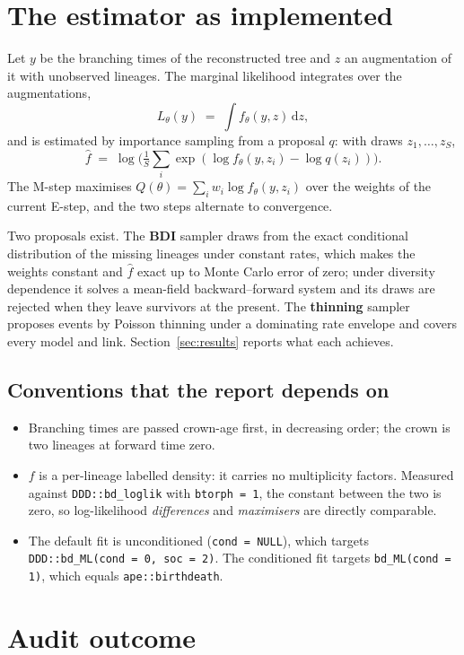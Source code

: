 \documentclass[11pt,a4paper]{article}
\newcommand{\code}[1]{\texttt{\small #1}}
\begin{document}
\section{The estimator as implemented}

Let $y$ be the branching times of the reconstructed tree and $z$ an augmentation of it with
unobserved lineages. The marginal likelihood integrates over the augmentations,
\[
  L_\theta(y) \;=\; \int f_\theta(y, z)\,\mathrm{d}z ,
\]
and is estimated by importance sampling from a proposal $q$: with draws $z_1,\dots,z_S$,
\[
  \widehat{f} \;=\; \log\Big( \tfrac{1}{S}\textstyle\sum_i \exp(\log f_\theta(y,z_i) - \log q(z_i)) \Big).
\]
The M-step maximises $Q(\theta) = \sum_i w_i \log f_\theta(y, z_i)$ over the weights of the current
E-step, and the two steps alternate to convergence.

Two proposals exist. The \textbf{BDI} sampler draws from the exact conditional distribution of the
missing lineages under constant rates, which makes the weights constant and $\widehat{f}$ exact up
to Monte Carlo error of zero; under diversity dependence it solves a mean-field backward--forward
system and its draws are rejected when they leave survivors at the present. The \textbf{thinning}
sampler proposes events by Poisson thinning under a dominating rate envelope and covers every
model and link. Section~\ref{sec:results} reports what each achieves.

\subsection{Conventions that the report depends on}
\begin{itemize}
\item Branching times are passed crown-age first, in decreasing order; the crown is two lineages
  at forward time zero.
\item $f$ is a per-lineage labelled density: it carries no multiplicity factors. Measured against
  \code{DDD::bd\_loglik} with \code{btorph = 1}, the constant between the two is zero, so
  log-likelihood \emph{differences} and \emph{maximisers} are directly comparable.
\item The default fit is unconditioned (\code{cond = NULL}), which targets
  \code{DDD::bd\_ML(cond = 0, soc = 2)}. The conditioned fit targets
  \code{bd\_ML(cond = 1)}, which equals \code{ape::birthdeath}.
\end{itemize}

\section{Audit outcome}
\end{document}

